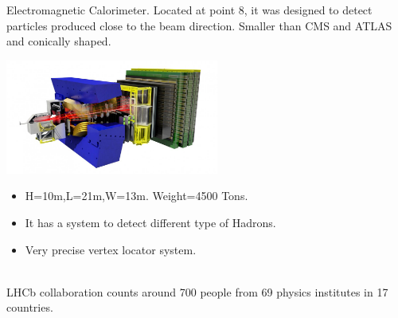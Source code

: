 \documentclass[8pt]{beamer}
\begin{document}
\begin{frame}[fragile]{Electromagnetic Calorimeter.}
	Located at point 8, it was designed to detect particles produced close to the beam direction.
	Smaller than CMS and ATLAS and conically shaped.
	
	\vspace{0.5cm}
	\begin{minipage}{0.7\textwidth}%
		\includegraphics[width=7cm]{8}
	\end{minipage}%
	\hfill%
	\begin{minipage}{0.3\textwidth}\raggedleft
		\begin{itemize}
			\item H=10m,L=21m,W=13m. Weight=4500 Tons.		
			\item It has a system to detect different type of Hadrons.
			\item Very precise vertex locator system.
			
		\end{itemize}
	\end{minipage}
	\\
	\vspace{0.5cm}
	LHCb collaboration counts around 700 people from 69 physics institutes in 17 countries.
\end{frame}

\end{document}

